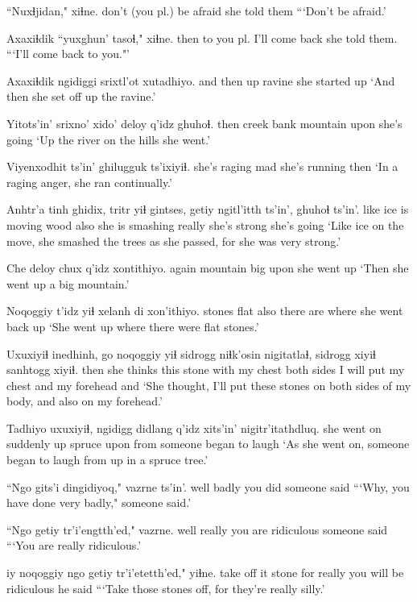 \documentclass[12pt]{article}
\begin{document}
\gll ``Nuxɬjidan," xiɬne.
{don't (you pl.) be afraid} {she told them}
\glt ```Don't be afraid.'
\glend 

\gll Axaxiɬdik ``yuxghun' tasoɬ," xiɬne.
then  {to you pl.} {I'll come back} {she told them.}
\glt ```I'll come back to you."'
\glend 

\gll Axaxiɬdik ngidiggi srixtl'ot xutadhiyo.
{and then} up  ravine {she started up}
\glt `And then she set off up the ravine.'
\glend 

\gll Yitots'in' srixno' xido' deloy  q'idz ghuhoɬ.
then  creek  bank mountain upon {she's going}
\glt `Up the river on the hills she went.'
\glend 

\gll Viyenxodhit ts'in' ghilugguk ts'ixiyiɬ.
{she's raging mad} {} {she's running}  then
\glt `In a raging anger, she ran continually.'
\glend 

\gll Anhtr'a tinh ghidix, tritr yiɬ gintses, getiy ngitl'itth ts'in', ghuhoɬ ts'in'.
like  ice {is moving} wood also {she is smashing} really {she's strong} {} {she's going}
\glt `Like ice on the move, she smashed the trees as she passed, for she was very strong.'
\glend 

\gll Che deloy  chux q'idz xontithiyo.
again mountain big upon {she went up}
\glt `Then she went up a big mountain.'
\glend 

\gll Noqoggiy t'idz yiɬ xelanh di  xon'ithiyo.
stones  flat also {there are} where {she went back up}
\glt `She went up where there were flat stones.'
\glend 

\gll Uxuxiyiɬ inedhinh, go  noqoggiy yiɬ sidrogg niɬk'osin nigitatlaɬ, sidrogg xiyiɬ sanhtogg xiyiɬ.
then  {she thinks} this  stone  with {my chest} {both sides} {I will put} {my chest} and {my forehead} and
\glt `She thought, I'll put these stones on both sides of my body, and also on my forehead.'
\glend 

\gll Tadhiyo uxuxiyiɬ, ngidigg didlang q'idz xits'in' nigitr'itathdluq.
{she went on} suddenly up  spruce  upon from  {someone began to laugh}
\glt `As she went on, someone began to laugh from up in a spruce tree.'
\glend 

\gll ``Ngo gits'i dingidiyoq," vazrne ts'in'.
well badly {you did} {someone said} {}
\glt ```Why, you have done very badly," someone said.'
\glend 

\gll ``Ngo getiy tr'i'engtth'ed," vazrne.
well really {you are ridiculous} {someone said}
\glt ```You are really ridiculous.'
\glend 

 iy noqoggiy ngo getiy tr'i'etetth'ed," yiɬne.
{take off}  it stone  for really {you will be ridiculous} {he said}
\glt ```Take those stones off, for they're really silly.'
\glend 
\end{document}
